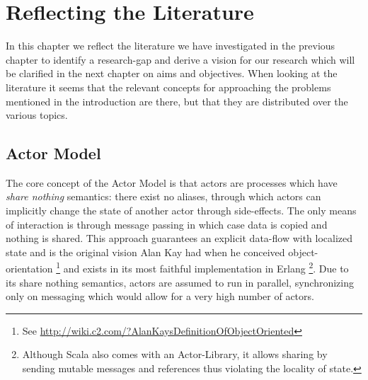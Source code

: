 \chapter{Reflecting the Literature}
\label{chap:refl}

In this chapter we reflect the literature we have investigated in the previous chapter to identify a research-gap and derive a vision for our research which will be clarified in the next chapter on aims and objectives. When looking at the literature it seems that the relevant concepts for approaching the problems mentioned in the introduction are there, but that they are distributed over the various topics.

\section{Actor Model}
The core concept of the Actor Model is that actors are processes which have \textit{share nothing} semantics: there exist no aliases, through which actors can implicitly change the state of another actor through side-effects. The only means of interaction is through message passing in which case data is copied and nothing is shared. This approach guarantees an explicit data-flow with localized state and is the original vision Alan Kay had when he conceived object-orientation \footnote{See \url{http://wiki.c2.com/?AlanKaysDefinitionOfObjectOriented}} and exists in its most faithful implementation in Erlang \footnote{Although Scala also comes with an Actor-Library, it allows sharing by sending mutable messages and references thus violating the locality of state.}. Due to its share nothing semantics, actors are assumed to run in parallel, synchronizing only on messaging which would allow for a very high number of actors.

